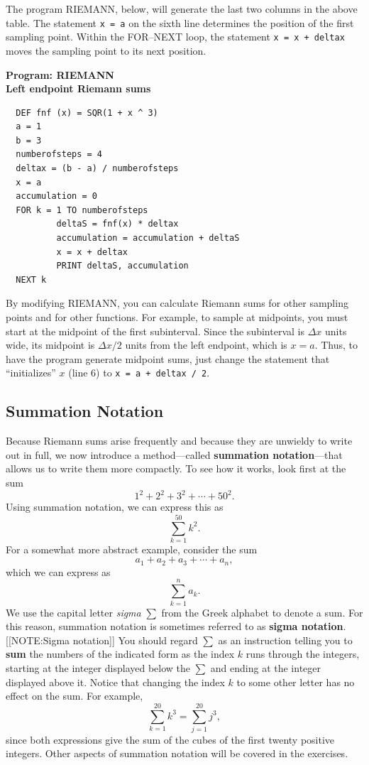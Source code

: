 The program RIEMANN, below, will generate the last two columns in the
above table.  The statement {\tt x = a} on the sixth
line determines the position of the first sampling point.  Within the
FOR--NEXT loop, the statement {\tt x = x + deltax} moves the sampling
point to its next position.

\begin{center}

{\bf Program: RIEMANN\\
\bf Left endpoint Riemann sums}\label{program RIEMANN}
\end{center}
\begin{verbatim}
  DEF fnf (x) = SQR(1 + x ^ 3)
  a = 1
  b = 3
  numberofsteps = 4
  deltax = (b - a) / numberofsteps
  x = a
  accumulation = 0
  FOR k = 1 TO numberofsteps
          deltaS = fnf(x) * deltax
          accumulation = accumulation + deltaS
          x = x + deltax
          PRINT deltaS, accumulation
  NEXT k
\end{verbatim}

By modifying RIEMANN, you can calculate Riemann sums for other
sampling points and for other functions.  For example, to sample at
midpoints, you must start at the midpoint of the first subinterval.
Since the subinterval is $\Delta x$ units wide, its midpoint is
$\Delta x/2$ units from the left endpoint, which is $x = a$.  Thus, to
have the program generate midpoint sums, just change the statement
that ``initializes'' $x$ (line 6) to \texttt{x = a + deltax / 2}.



\subsection{Summation Notation}
\label{subsec:summation-notation}

	Because Riemann sums arise frequently and because they are unwieldy to write out in full, we now introduce a 
method---called {\bf summation notation}---that allows us to write them more compactly.  To see how it works, look first at the sum 
	\[
1^2 + 2^2 + 3^2 + \cdots + 50^2.
\] 
Using summation notation, we can express this as 
	\[
\sum_{k=1}^{50} k^2.
\] 
For a somewhat more abstract example, consider the sum 
	\[
a_1 + a_2 + a_3 + \cdots + a_n,
\] 
which we can express as 
	\[
\sum_{k=1}^n a_k.
\] 
We use the capital letter {\em sigma\/} $\sum$ from the Greek alphabet to denote a sum.  For this reason, summation notation is sometimes referred to as {\bf sigma notation\/}.  
	[[NOTE:Sigma notation]]
You should regard $\sum$ as an instruction telling you to {\bf sum} the numbers of the indicated form as the index $k$ runs through the integers, starting at the integer displayed below the $\sum$ and ending at the integer displayed above it.  Notice that changing the index $k$ to some other letter has no effect on the sum.  For example, 	
	\[
\sum_{k=1}^{20} k^3 = \sum_{j=1}^{20} j^3,
\]
since both expressions give the sum of the cubes of the first twenty positive integers.  Other aspects of summation notation will be covered in the exercises.

